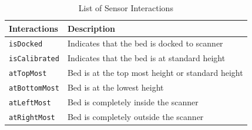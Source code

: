 \documentclass{article}
\begin{document}
\begin{table}
\centering
\begin{tabular}{ |l|l| } 
	\hline
	\textbf{Interactions} & \textbf{Description}\\
	\hline
	\texttt{isDocked} & Indicates that the bed is docked to scanner\\
	\texttt{isCalibrated} & Indicates that the bed is at standard height\\
	\texttt{atTopMost} & Bed is at the top most height or standard height\\
	\texttt{atBottomMost} & Bed is at the lowest height\\
	\texttt{atLeftMost} & Bed is completely inside the scanner\\
	\texttt{atRightMost} & Bed is completely outside the scanner\\
	\hline
\end{tabular}
\caption{List of Sensor Interactions}
\label{table:3}
\end{table}

\newpage
\end{document}
